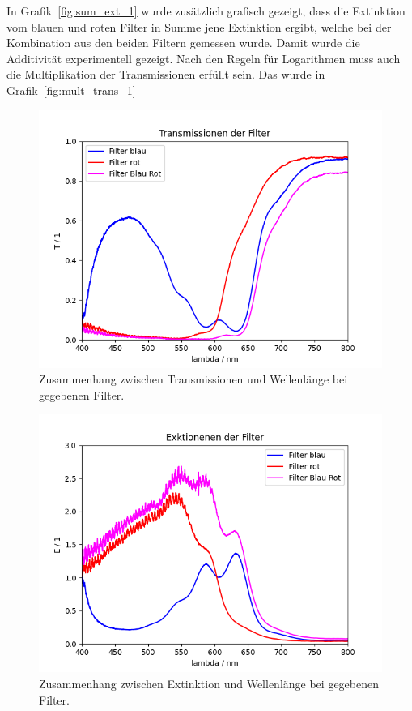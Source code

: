 \documentclass{article}
\begin{document}
In Grafik~\ref{fig:sum_ext_1} wurde zusätzlich grafisch gezeigt, dass die Extinktion vom blauen und roten Filter in Summe jene Extinktion ergibt, welche bei der Kombination aus den beiden Filtern gemessen wurde. Damit wurde die Additivität experimentell gezeigt. Nach den Regeln für Logarithmen muss auch die Multiplikation der Transmissionen erfüllt sein. Das wurde in Grafik~\ref{fig:mult_trans_1}




\begin{figure}[H]
\centering
\caption{Zusammenhang zwischen Transmissionen und Wellenlänge bei gegebenen Filter.}
\label{fig:T_Farben}
\includegraphics[scale=0.6]{FF_Transmissionen.png}
\end{figure}



\begin{figure}[H]
\centering
\caption{Zusammenhang zwischen Extinktion und Wellenlänge bei gegebenen Filter.}
\label{fig:Ext}
\includegraphics[scale=0.6]{FF_Extinktionen.png}
\end{figure}
\end{document}
